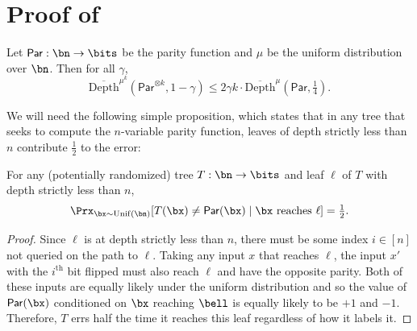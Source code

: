 \section{Proof of~}



\begin{claim} 
    \label{claim:linear-dependence}
    Let $\mathsf{Par} : \bn\to\bits$ be the parity function and $\mu $ be the uniform distribution over $\bn$. Then for all $\gamma$,
    \[
\overline{\mathrm{Depth}}^{\mu^k}(\mathsf{Par}^{\otimes k}, 1 -\gamma) \leq2 \gamma k \cdot \overline{\mathrm{Depth}}^\mu(\mathsf{Par}, \tfrac1{4}).
    \]
\end{claim}

We will need the following simple proposition, which states that in any tree that seeks to compute the $n$-variable parity function, leaves of depth strictly less than $n$ contribute $\frac1{2}$ to the error:
\begin{proposition}
    \label{prop:par-query-all}
    For any (potentially randomized) tree $T: \bn \to \bits$ and leaf $\ell$ of $T$ with depth strictly less than $n$,
    \begin{equation*}
        \Prx_{\bx \sim \mathrm{Unif}(\bn)}[T(\bx) \neq \mathsf{Par}(\bx) \mid \bx \text{ reaches } \ell] = \tfrac{1}{2}.
    \end{equation*}
\end{proposition}
\begin{proof}
    Since $\ell$ is at depth strictly less than $n$, there must be some index $i \in [n]$ not queried on the path to $\ell$. Taking any input $x$ that reaches $\ell$, the input $x'$ with the $i^{\text{th}}$ bit flipped must also reach $\ell$ and have the opposite parity. Both of these inputs are equally likely under the uniform distribution and so the value of $\mathsf{Par}(\bx)$ conditioned on $\bx$ reaching $\bell$ is equally likely to be $+1$ and $-1$. Therefore, $T$ errs half the time it reaches this leaf regardless of how it labels it.
\end{proof}

